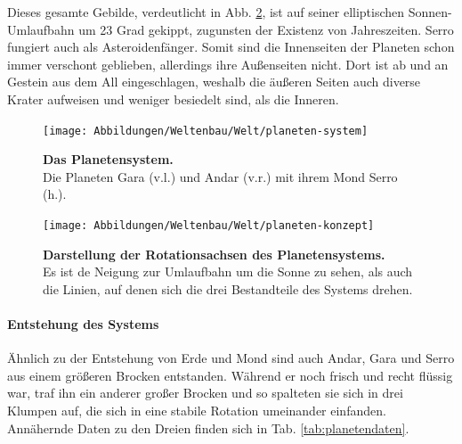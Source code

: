 Dieses gesamte Gebilde, verdeutlicht in Abb. \ref{fig:planeten-konzept}, ist auf seiner elliptischen Sonnen-Umlaufbahn um 23 Grad gekippt, zugunsten der Existenz von Jahreszeiten.
Serro fungiert auch als Asteroidenfänger.
Somit sind die Innenseiten der Planeten schon immer verschont geblieben, allerdings ihre Außenseiten nicht.
Dort ist ab und an Gestein aus dem All eingeschlagen, weshalb die äußeren Seiten auch diverse Krater aufweisen und weniger besiedelt sind, als die Inneren.

\begin{figure}[tbh]
	\centering
	\texttt{[image: Abbildungen/Weltenbau/Welt/planeten-system]}
	\caption[Das Planetensystem]{\textbf{Das Planetensystem.}\\
	Die Planeten Gara (v.l.) und Andar (v.r.) mit ihrem Mond Serro (h.).}
	\label{fig:planeten-system}
\end{figure}

\begin{figure}[tbh]
	\centering
	\texttt{[image: Abbildungen/Weltenbau/Welt/planeten-konzept]}
	\caption[Konzept des Planetensystems]{\textbf{Darstellung der Rotationsachsen des Planetensystems.}\\
	Es ist de Neigung zur Umlaufbahn um die Sonne zu sehen, als auch die Linien, auf denen sich die drei Bestandteile des Systems drehen.}
	\label{fig:planeten-konzept}
\end{figure}

\paragraph{Entstehung des Systems} 
Ähnlich zu der Entstehung von Erde und Mond sind auch Andar, Gara und Serro aus einem größeren Brocken entstanden.
Während er noch frisch und recht flüssig war, traf ihn ein anderer großer Brocken und so spalteten sie sich in drei Klumpen auf, die sich in eine stabile Rotation umeinander einfanden.
Annähernde Daten zu den Dreien finden sich in Tab. \ref{tab:planetendaten}.

